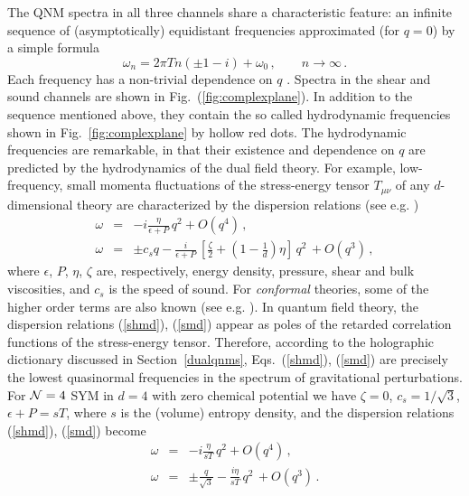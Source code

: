 \documentclass[]{iopart}
\begin{document}
The QNM spectra in all three channels share a characteristic feature: an
infinite sequence of (asymptotically) equidistant frequencies approximated
(for $q=0$) by a simple formula \cite{Starinets:2002br, Nunez:2003eq,
  Natario:2004jd}
%
\begin{equation}
\omega_n = 2\pi T n \left( \pm 1 - i\right) + \omega_0\,, \qquad  n\rightarrow \infty\,. 
\label{modeapprox}
\end{equation}
%
Each frequency has a non-trivial dependence on $q$ \cite{Starinets:2002br,
  Nunez:2003eq}.  Spectra in the shear and sound channels are shown in
Fig.~(\ref{fig:complexplane}).  In addition to the sequence mentioned above,
they contain the so called hydrodynamic frequencies shown in
Fig.~\ref{fig:complexplane} by hollow red dots.  The hydrodynamic frequencies
are remarkable, in that their existence and dependence on $q$ are predicted by
the hydrodynamics of the dual field theory. For example, low-frequency, small
momenta fluctuations of the stress-energy tensor $T_{\mu\nu}$ of any
$d$-dimensional theory are characterized by the dispersion relations (see
e.g. \cite{Policastro:2002se, Parnachev:2005hh, Baier:2007ix})
%
\begin{eqnarray}
\omega &=& - i \frac{\eta}{\epsilon +P}\, q^2 + O\left( q^4 \right)\,, \label{shmd} \\
\omega &=& \pm c_s q - \frac{i}{\epsilon +P}\, \left[  \frac{\zeta}{2}
 + \left( 1 - \frac{1}{d} \right) \eta \right]\, q^2 \, 
+  O\left( q^3 \right)\,, \label{smd}
\end{eqnarray}
%
where $\epsilon$, $P$, $\eta$, $\zeta$ are, respectively, energy density,
pressure, shear and bulk viscosities, and $c_s$ is the speed of sound.  For
{\it conformal} theories, some of the higher order terms are also known (see
e.g. \cite{Baier:2007ix}). In quantum field theory, the dispersion relations
(\ref{shmd}), (\ref{smd}) appear as poles of the retarded correlation
functions of the stress-energy tensor. Therefore, according to the holographic
dictionary discussed in Section~\ref{dualqnms}, Eqs.~(\ref{shmd}), (\ref{smd})
are precisely the lowest quasinormal frequencies in the spectrum of
gravitational perturbations.  For ${\cal N}=4$ SYM in $d=4$ with zero chemical
potential we have $\zeta=0$, $c_s=1/\sqrt{3}$, $\epsilon + P = s T$, where $s$
is the (volume) entropy density, and the dispersion relations (\ref{shmd}),
(\ref{smd}) become
%
\begin{eqnarray}
\omega &=& - i \frac{\eta}{s T}\, q^2 + O\left( q^4 \right)\,, \label{shmd1} \\
\omega &=& \pm \frac{q}{\sqrt{3}} - \frac{i \eta}{s T}\, q^2 \, 
+  O\left( q^3 \right)\,. \label{smd1}
\end{eqnarray}
\end{document}
